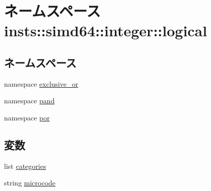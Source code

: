 \hypertarget{namespaceinsts_1_1simd64_1_1integer_1_1logical}{
\section{ネームスペース insts::simd64::integer::logical}
\label{namespaceinsts_1_1simd64_1_1integer_1_1logical}
}
\subsection*{ネームスペース}
\begin{DoxyCompactItemize}
\item 
namespace \hyperlink{namespaceinsts_1_1simd64_1_1integer_1_1logical_1_1exclusive__or}{exclusive\_\-or}
\item 
namespace \hyperlink{namespaceinsts_1_1simd64_1_1integer_1_1logical_1_1pand}{pand}
\item 
namespace \hyperlink{namespaceinsts_1_1simd64_1_1integer_1_1logical_1_1por}{por}
\end{DoxyCompactItemize}
\subsection*{変数}
\begin{DoxyCompactItemize}
\item 
list \hyperlink{namespaceinsts_1_1simd64_1_1integer_1_1logical_a273cf0f1630af14c1582f05e53354a55}{categories}
\item 
string \hyperlink{namespaceinsts_1_1simd64_1_1integer_1_1logical_a770f11a173e99389a8802f0107ed8f52}{microcode}
\end{DoxyCompactItemize}


